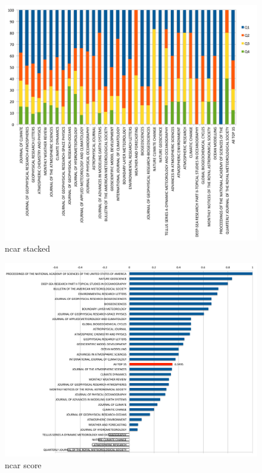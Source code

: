 \documentclass{sig-alternate}
\begin{document}
\begin{figure}[htb] 
  \centering 
    \includegraphics[width=1.0\textwidth]{images-new/ncar-journal-stacked-rank-by-pubs.pdf} 
  \caption{ncar stacked}\label{F:ncar-stacked} 
\end{figure} 

\begin{figure}[htb] 
  \centering 
    \includegraphics[width=1.0\textwidth]{images-new/ncar-journal-bar-by-score.pdf} 
  \caption{ncar score}\label{F:ncar-score} 
\end{figure} 
\end{document}
